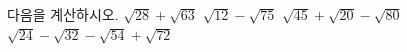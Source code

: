 다음을 계산하시오.
 $\sqrt{28}+\sqrt{63}$
 $\sqrt{12}-\sqrt{75}$
 $\sqrt{45}+\sqrt{20}-\sqrt{80}$
 $\sqrt{24}-\sqrt{32}-\sqrt{54}+\sqrt{72}$
